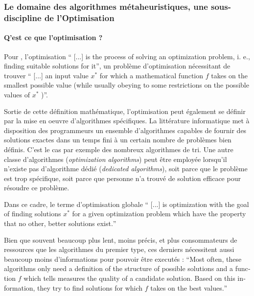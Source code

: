 \subsubsection{Le domaine des algorithmes métaheuristiques, une sous-discipline de l'Optimisation}

\paragraph{Q'est ce que l'optimisation ?}

Pour \textcite[22]{Weise2011}, l'optimisation \foreignquote{english}{ [...] is the process of solving an optimization problem, i. e., finding suitable solutions for it}, un problème d'optimisation nécessitant de trouver \foreignquote{english}{ [...] an input value $x^*$ for which a mathematical function $f$ takes on the smallest possible value (while usually obeying to some restrictions on the possible values of $x^*$ )}.

Sortie de cette définition mathématique, l'optimisation peut également se définir par la mise en oeuvre d'algorithmes spécifiques. La littérature informatique met à disposition des programmeurs un ensemble d'algorithmes capables de fournir des solutions exactes dans un temps fini à un certain nombre de problèmes bien définis. C'est le cas par exemple des nombreux algorithmes de tri. Une autre classe d'algorithmes (\textit{optimization algorithms}) peut être employée lorsqu'il n'existe pas d'algorithme dédié (\textit{dedicated algorithms}), soit parce que le problème est trop spécifique, soit parce que personne n'a trouvé de solution efficace pour résoudre ce problème. 

Dans ce cadre, le terme d'optimisation globale \foreignquote{english}{ [...] is optimization with the goal of finding solutions $x^*$ for a given optimization problem which have the property that no other, better solutions exist.}

Bien que souvent beaucoup plus lent, moins précis, et plus consommateurs de ressources que les algorithmes du premier type, ces derniers nécessitent aussi beaucoup moins d'informations pour pouvoir être executés : \foreignquote{english}{Most often, these algorithms only need a definition of the structure of possible solutions and a function $f$ which tells measures the quality of a candidate solution. Based on this information, they try to find solutions for which $f$ takes on the best values.} \autocite[24]{Weise2011}

